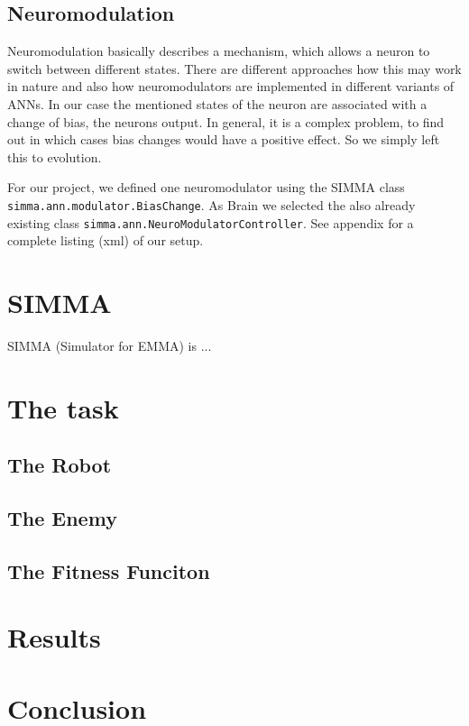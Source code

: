 \documentclass[12pt,fleqn,a4paper]{article}
\begin{document}
\subsection{Neuromodulation}
Neuromodulation basically describes a mechanism, which allows a neuron to switch between different states. There are different approaches how this may work in nature and also how neuromodulators are implemented in different variants of ANNs. In our case the mentioned states of the neuron are associated with a change of bias, the neurons output. In general, it is a complex problem, to find out in which cases bias changes would have a positive effect. So we simply left this to evolution.

For our project, we defined one neuromodulator using the SIMMA class\\ \texttt{simma.ann.modulator.BiasChange}. As Brain we selected the also already existing class \texttt{simma.ann.NeuroModulatorController}. See appendix for a complete listing (xml) of our setup.


\section{SIMMA}
SIMMA (Simulator for EMMA) is ...

\section{The task}

\subsection{The Robot}

\subsection{The Enemy}

\subsection{The Fitness Funciton}

\section{Results}

\section{Conclusion}
\end{document}
